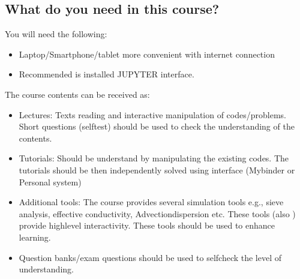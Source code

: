 \documentclass[letterpaper,10pt,english]{sphinxmanual}
\begin{document}
\subsection{What do you need in this course?}
\label{\detokenize{contents/background/00_general:what-do-you-need-in-this-course}}
You will need the following:
\begin{itemize}
\item {} 
Laptop/Smartphone/tablet more convenient with internet connection

\item {} 
Recommended is installed JUPYTER interface.

\end{itemize}

The course contents can be received as:
\begin{itemize}
\item {} 
Lectures: Texts reading and interactive manipulation of codes/problems. Short questions (self\sphinxhyphen{}test) should be used to check the understanding of the contents.

\item {} 
Tutorials: Should be understand by manipulating the existing codes. The tutorials should be then independently solved using  interface (Mybinder or Personal system)

\item {} 
Additional tools: The course provides several simulation tools\sphinxhyphen{} e.g., sieve analysis, effective conductivity, Advection\sphinxhyphen{}dispersion etc. These tools (also ) provide high\sphinxhyphen{}level interactivity. These tools should be used to enhance learning.

\item {} 
Question banks/exam questions should be used to self\sphinxhyphen{}check the level of understanding.

\end{itemize}

\begin{sphinxVerbatim}[commandchars=\\\{\}]
   
   
   
   



\end{sphinxVerbatim}
\end{document}
